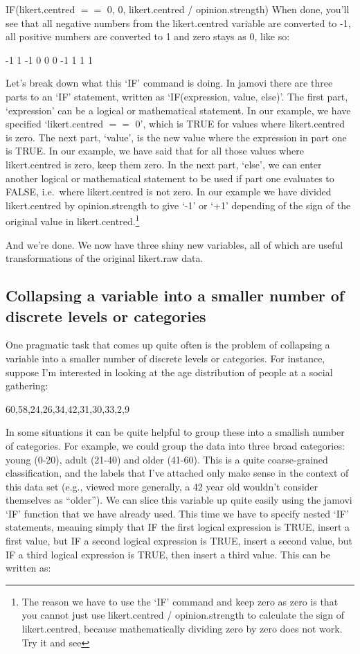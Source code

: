 \documentclass[
]{book}
\begin{document}
IF(likert.centred \(==\) 0, 0, likert.centred / opinion.strength) When done, you'll see that all negative numbers from the likert.centred variable are converted to -1, all positive numbers are converted to 1 and zero stays as 0, like so:

-1 1 -1 0 0 0 -1 1 1 1

Let's break down what this `IF' command is doing. In jamovi there are three parts to an `IF' statement, written as `IF(expression, value, else)'. The first part, `expression' can be a logical or mathematical statement. In our example, we have specified `likert.centred \(==\) 0', which is TRUE for values where likert.centred is zero. The next part, `value', is the new value where the expression in part one is TRUE. In our example, we have said that for all those values where likert.centred is zero, keep them zero. In the next part, `else', we can enter another logical or mathematical statement to be used if part one evaluates to FALSE, i.e.~where likert.centred is not zero. In our example we have divided likert.centred by opinion.strength to give `-1' or `+1' depending of the sign of the original value in likert.centred.\footnote{The reason we have to use the `IF' command and keep zero as zero is that you cannot just use likert.centred / opinion.strength to calculate the sign of likert.centred, because mathematically dividing zero by zero does not work. Try it and see}

And we're done. We now have three shiny new variables, all of which are useful transformations of the original likert.raw data.

\hypertarget{collapsing-a-variable-into-a-smaller-number-of-discrete-levels-or-categories}{%
\subsection{Collapsing a variable into a smaller number of discrete levels or categories}\label{collapsing-a-variable-into-a-smaller-number-of-discrete-levels-or-categories}}

One pragmatic task that comes up quite often is the problem of collapsing a variable into a smaller number of discrete levels or categories. For instance, suppose I'm interested in looking at the age distribution of people at a social gathering:

60,58,24,26,34,42,31,30,33,2,9

In some situations it can be quite helpful to group these into a smallish number of categories. For example, we could group the data into three broad categories: young (0-20), adult (21-40) and older (41-60). This is a quite coarse-grained classification, and the labels that I've attached only make sense in the context of this data set (e.g., viewed more generally, a 42 year old wouldn't consider themselves as ``older''). We can slice this variable up quite easily using the jamovi `IF' function that we have already used. This time we have to specify nested `IF' statements, meaning simply that IF the first logical expression is TRUE, insert a first value, but IF a second logical expression is TRUE, insert a second value, but IF a third logical expression is TRUE, then insert a third value. This can be written as:
\end{document}
